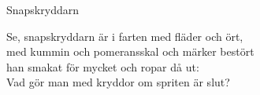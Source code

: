 \begin{song}{Snapskryddarn}

	
	
	Se, snapskryddarn är i farten med fläder och ört,\\
	med kummin och pomeransskal och märker bestört\\
	han smakat för mycket och ropar då ut:\\
	Vad gör man med kryddor om spriten är slut?
	
\end{song}
